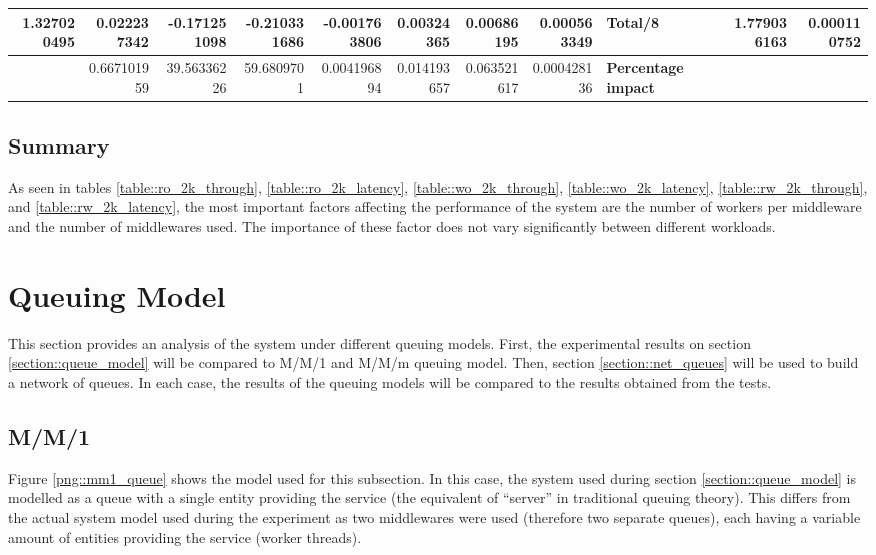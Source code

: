 \documentclass[11pt,a4paper]{article}
\begin{document}
{\begin{landscape}
{\begin{tabular}{|*{15}{r|}}
                \hline 1.327020495 & 0.022237342 & -0.171251098 & -0.210331686 & -0.001763806 & 0.00324365 & 0.00686195 & 0.000563349 & \multicolumn{3}{|l|}{\textbf{Total/8}} & \multicolumn{2}{|r|}{} & 1.779036163 & 0.000110752 \\
                \hline & 0.667101959 & 39.56336226 & 59.6809701 & 0.004196894 & 0.014193657 & 0.063521617 & 0.000428136 & \multicolumn{3}{|l|}{\textbf{Percentage impact}} & \multicolumn{4}{|l|}{} \\
                \hline
            \end{tabular}
        }
        \label{table::rw_2k_latency}

    \end{landscape}
    \clearpage%
}

\subsection{Summary}
As seen in tables \ref{table::ro_2k_through}, \ref{table::ro_2k_latency}, \ref{table::wo_2k_through}, \ref{table::wo_2k_latency}, \ref{table::rw_2k_through}, and \ref{table::rw_2k_latency}, the most important factors affecting the performance of the system are the number of workers per middleware and the number of middlewares used. The importance of these factor does not vary significantly between different workloads.


\newpage

\section{Queuing Model}
This section provides an analysis of the system under different queuing models. First, the experimental results on section \ref{section::queue_model} will be compared to M/M/1 and M/M/m queuing model. Then, section \ref{section::net_queues} will be used to build a network of queues. In each case, the results of the queuing models will be compared to the results obtained from the tests.

\subsection{M/M/1}
Figure \ref{png::mm1_queue} shows the model used for this subsection. In this case, the system used during section \ref{section::queue_model} is modelled as a queue with a single entity providing the service (the equivalent of ``server'' in traditional queuing theory). This differs from the actual system model used during the experiment as two middlewares were used (therefore two separate queues), each having a variable amount of entities providing the service (worker threads).
\end{document}
